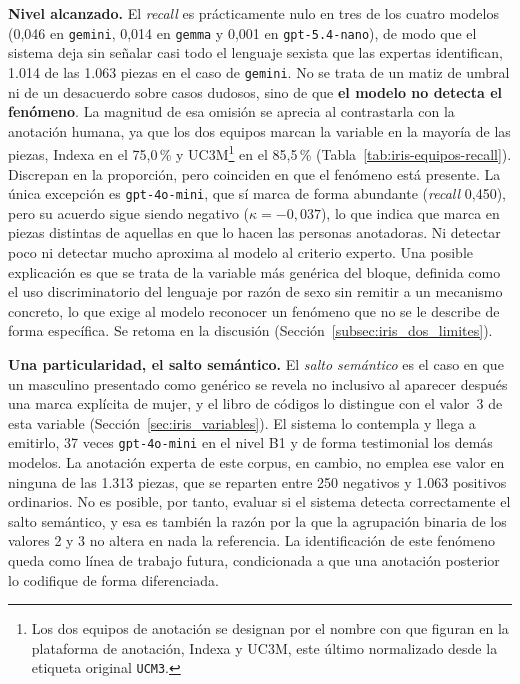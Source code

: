 \textbf{Nivel alcanzado.} El \textit{recall} es prácticamente nulo en tres de los cuatro
modelos (0,046 en \texttt{gemini}, 0,014 en \texttt{gemma} y 0,001 en
\texttt{gpt-5.4-nano}), de modo que el sistema deja sin señalar casi todo el lenguaje
sexista que las expertas identifican, 1.014 de las 1.063 piezas en el caso de
\texttt{gemini}. No se trata de un
matiz de umbral ni de un desacuerdo sobre casos dudosos, sino de que \textbf{el modelo
no detecta el fenómeno}. La magnitud de esa omisión se aprecia al contrastarla con la
anotación humana, ya que los dos equipos marcan la variable en la mayoría de las
piezas, Indexa en el 75,0\,\% y UC3M\footnote{Los dos equipos de anotación se designan por el nombre con que figuran en la plataforma de anotación, Indexa y UC3M, este último normalizado desde la etiqueta original \texttt{UCM3}.} en el 85,5\,\%
(Tabla~\ref{tab:iris-equipos-recall}). Discrepan en la proporción, pero coinciden en
que el fenómeno está presente. La única excepción es \texttt{gpt-4o-mini}, que sí marca de
forma abundante (\textit{recall} 0,450), pero su acuerdo sigue siendo negativo
($\kappa = -0,037$), lo que indica que marca en piezas distintas de aquellas en que lo
hacen las personas anotadoras. Ni detectar poco ni detectar mucho aproxima al modelo al criterio
experto. Una posible explicación es que se trata de la variable más genérica del
bloque, definida como el uso discriminatorio del lenguaje por razón de sexo sin remitir
a un mecanismo concreto, lo que exige al modelo reconocer un fenómeno que no se le
describe de forma específica. Se retoma en la discusión
(Sección~\ref{subsec:iris_dos_limites}).

\textbf{Una particularidad, el salto semántico.} El \emph{salto semántico} es el caso
en que un masculino presentado como genérico se revela no inclusivo al aparecer
después una marca explícita de mujer, y el libro de códigos lo distingue con el
valor~3 de esta variable (Sección~\ref{sec:iris_variables}). El sistema lo contempla y
llega a emitirlo, 37 veces \texttt{gpt-4o-mini} en el nivel B1 y de forma testimonial
los demás modelos. La anotación experta de este corpus, en cambio, no emplea ese valor
en ninguna de las 1.313 piezas, que se reparten entre 250 negativos y 1.063 positivos
ordinarios. No es posible, por tanto, evaluar si el sistema detecta correctamente el
salto semántico, y esa es también la razón por la que la agrupación binaria de los
valores 2 y 3 no altera en nada la referencia. La identificación de este fenómeno queda
como línea de trabajo futura, condicionada a que una anotación posterior lo codifique
de forma diferenciada.

